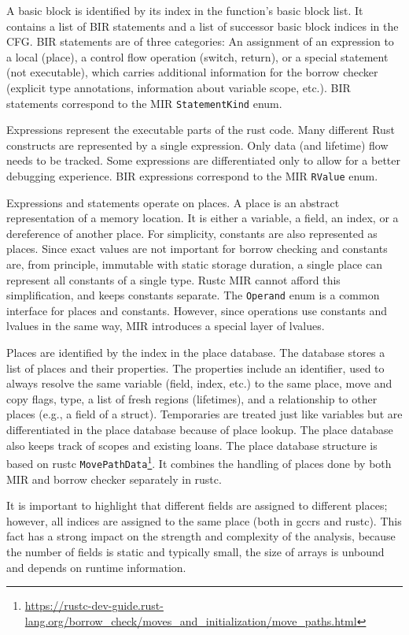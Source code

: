 \documentclass[
  11pt,
  twoside,symmetric]{report}
\DeclareRobustCommand{\href}[2]{#2\footnote{\url{#1}}}
\begin{document}
A basic block is identified by its index in the function's basic block
list. It contains a list of BIR statements and a list of successor basic
block indices in the CFG. BIR statements are of three categories: An
assignment of an expression to a local (place), a control flow operation
(switch, return), or a special statement (not executable), which carries
additional information for the borrow checker (explicit type
annotations, information about variable scope, etc.). BIR statements
correspond to the MIR \texttt{StatementKind} enum.

Expressions represent the executable parts of the rust code. Many
different Rust constructs are represented by a single expression. Only
data (and lifetime) flow needs to be tracked. Some expressions are
differentiated only to allow for a better debugging experience. BIR
expressions correspond to the MIR \texttt{RValue} enum.

Expressions and statements operate on places. A place is an abstract
representation of a memory location. It is either a variable, a field,
an index, or a dereference of another place. For simplicity, constants
are also represented as places. Since exact values are not important for
borrow checking and constants are, from principle, immutable with static
storage duration, a single place can represent all constants of a single
type. Rustc MIR cannot afford this simplification, and keeps constants
separate. The \texttt{Operand} enum is a common interface for places and
constants. However, since operations use constants and lvalues in the
same way, MIR introduces a special layer of lvalues.

Places are identified by the index in the place database. The database
stores a list of places and their properties. The properties include an
identifier, used to always resolve the same variable (field, index,
etc.) to the same place, move and copy flags, type, a list of fresh
regions (lifetimes), and a relationship to other places (e.g., a field
of a struct). Temporaries are treated just like variables but are
differentiated in the place database because of place lookup. The place
database also keeps track of scopes and existing loans. The place
database structure is based on rustc
\href{https://rustc-dev-guide.rust-lang.org/borrow_check/moves_and_initialization/move_paths.html}{\texttt{MovePathData}}.
It combines the handling of places done by both MIR and borrow checker
separately in rustc.

It is important to highlight that different fields are assigned to
different places; however, all indices are assigned to the same place
(both in gccrs and rustc). This fact has a strong impact on the strength
and complexity of the analysis, because the number of fields is static
and typically small, the size of arrays is unbound and depends on
runtime information.
\end{document}
